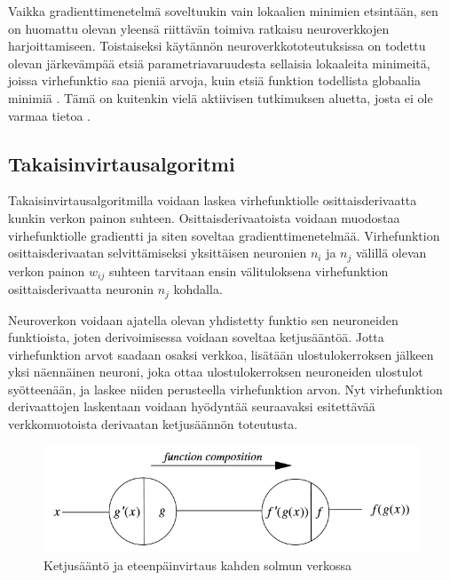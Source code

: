 \documentclass[finnish]{tktltiki2}
\theoremstyle{definition}
\theoremstyle{remark}
\begin{document}

  Vaikka gradienttimenetelmä soveltuukin vain lokaalien minimien etsintään, sen on huomattu olevan yleensä riittävän toimiva ratkaisu neuroverkkojen harjoittamiseen. Toistaiseksi käytännön neuroverkkototeutuksissa on todettu olevan järkevämpää etsiä parametriavaruudesta sellaisia lokaaleita minimeitä, joissa virhefunktio saa pieniä arvoja, kuin etsiä funktion todellista globaalia minimiä \cite{neural-optimization-goodfellow-2015}. Tämä on kuitenkin vielä aktiivisen tutkimuksen aluetta, josta ei ole varmaa tietoa \cite{Goodfellow-et-al-2016}.

  \subsection{Takaisinvirtausalgoritmi}
  Takaisinvirtausalgoritmilla voidaan laskea virhefunktiolle osittaisderivaatta kunkin verkon painon suhteen. Osittaisderivaatoista voidaan muodostaa virhefunktiolle gradientti ja siten soveltaa gradienttimenetelmää. Virhefunktion osittaisderivaatan selvittämiseksi yksittäisen neuronien $n_i$ ja $n_j$ välillä olevan verkon painon $w_{ij}$ suhteen tarvitaan ensin välituloksena virhefunktion osittaisderivaatta neuronin $n_j$ kohdalla. 

  Neuroverkon voidaan ajatella olevan yhdistetty funktio sen neuroneiden funktioista, joten derivoimisessa voidaan soveltaa ketjusääntöä. Jotta virhefunktion arvot saadaan osaksi verkkoa, lisätään ulostulokerroksen jälkeen yksi näennäinen neuroni, joka ottaa ulostulokerroksen neuroneiden ulostulot syötteenään, ja laskee niiden perusteella virhefunktion arvon. Nyt virhefunktion derivaattojen laskentaan voidaan hyödyntää seuraavaksi esitettävää verkkomuotoista derivaatan ketjusäännön toteutusta. 
    
  \begin{figure}[h]
    \centering
    \includegraphics[scale=0.5]{function-composition}
    \caption{Ketjusääntö ja eteenpäinvirtaus kahden solmun verkossa \cite{Rojas96}}
    \label{pic:composition}
  \end{figure}
\end{document}
